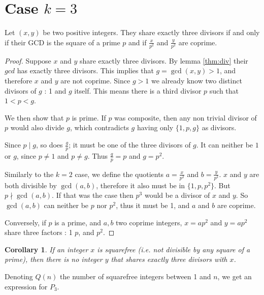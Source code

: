 \documentclass[a4paper, 10pt]{article}
\numberwithin{equation}{section} %
\begin{document}
\section*{Case $k=3$}

\begin{lemma}
    Let $(x,y)$ be two positive integers. They share exactly three divisors if and only if
    their GCD  is the square of a prime $p$ and if $\frac{x}{p^2}$ and $\frac{y}{p^2}$
    are coprime.
    \label{thm:primesq}
\end{lemma}
\begin{proof}
Suppose $x$ and $y$ share exactly three divisors. By lemma \ref{thm:div} their $gcd$
has exactly three divisors.
This implies that $g = \gcd(x,y) >1$, and therefore $x$ and $y$ are not coprime.
Since $g > 1$ we already know two distinct divisors of $g$ : 1 and $g$ itself.
This means there is a third divisor $p$ such that $1 < p < g$.

We then show that $p$ is prime. If $p$ was composite, then any non trivial divisor of
$p$ would also divide $g$, which contradicts $g$ having only $\{1,p,g\}$ as divisors.

Since $p  \mid  g$, so does $\frac{g}{p}$; it must be one of the three divisors of $g$.
It can neither be $1$ or $g$, since $p \neq 1$ and $p \neq g$. Thus $\frac{g}{p} = p$
and $g = p^2$.

Similarly to the $k=2$ case, we define the quotients $a =\frac{x}{p^2}$ and $b = \frac{y}{p^2}$.
$x$ and $y$ are both divisible by $\gcd(a,b)$, therefore it also must be in $\{1,p,p^2\}$.
But $p \nmid  \gcd(a,b)$. If that was the case then $p^3$ would be a divisor of $x$ and $y$.
So $\gcd(a,b)$ can neither be $p$ nor $p^2$, thus it must be 1, and $a$ and $b$ are coprime.


Conversely, if $p$ is a prime, and $a,b$ two coprime integers, $x = ap^2$ and $y = ap^2$
share three factors : 1 $p$, and $p^2$.
\end{proof}
\newtheorem{cor}{Corollary}
\begin{cor}
    If an integer $x$ is squarefree (i.e. not divisible by any square of a prime), then there is no integer $y$ that
    shares exactly three divisors with $x$.
    \label{thm:sqf}
\end{cor}


Denoting $Q(n)$ the number of squarefree integers between 1 and $n$, we get
an expression for $P_3$.
\end{document}
